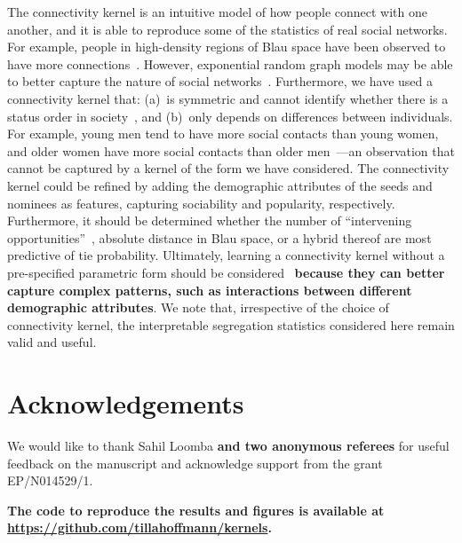 \documentclass{scrartcl}
\newcommand{\change}[1]{\textbf{#1}}
\begin{document}
\begin{refsection}
The connectivity kernel is an intuitive model of how people connect with one another, and it is able to reproduce some of the statistics of real social networks. For example, people in high-density regions of Blau space have been observed to have more connections~\cite{Currarini2009}. However, exponential random graph models may be able to better capture the nature of social networks~\cite{Wimmer2010}. Furthermore, we have used a connectivity kernel that: (a)~is symmetric and cannot identify whether there is a status order in society~\cite{Chan2004,Ball2013}, and (b)~only depends on differences between individuals. For example, young men tend to have more social contacts than young women, and older women have more social contacts than older men~\cite{Bhattacharya2016}---an observation that cannot be captured by a kernel of the form we have considered. The connectivity kernel could be refined by adding the demographic attributes of the seeds and nominees as features, capturing sociability and popularity, respectively. Furthermore, it should be determined whether the number of ``intervening opportunities''~\cite{Stouffer1940}, absolute distance in Blau space, or a hybrid thereof are most predictive of tie probability. Ultimately, learning a connectivity kernel without a pre-specified parametric form should be considered~\cite{Frolich2006} \change{because they can better capture complex patterns, such as interactions between different demographic attributes}. We note that, irrespective of the choice of connectivity kernel, the interpretable segregation statistics considered here remain valid and useful.

\section*{Acknowledgements}

We would like to thank Sahil Loomba \change{and two anonymous referees} for useful feedback on the manuscript and acknowledge support from the grant EP/N014529/1.

\printbibliography
\end{refsection}

\ifdefined\composite
\pagebreak
\setcounter{page}{1}

\appendix
\vspace{1em}\noindent\change{The code to reproduce the results and figures is available at \url{https://github.com/tillahoffmann/kernels}.}
\end{document}

